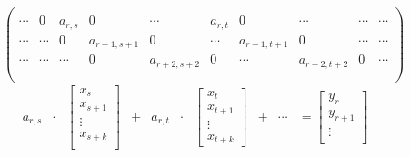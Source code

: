 \documentclass{article}
\begin{document}
      \begin{figure}[ht]
        \centering
        $$
        \begin{pmatrix}
          \\
          \cdots & 0 & a_{r,s} &  0 & \cdots & a_{r,t} & 0 & \cdots & \cdots & \cdots \\
          \cdots & \cdots & 0 & a_{r+1,s+1} & 0 & \cdots & a_{r+1,t+1} & 0 & \cdots & \cdots \\
          \cdots & \cdots & \cdots & 0 & a_{r+2,s+2} & 0 & \cdots & a_{r+2,t+2} & 0 & \cdots \\
          \\
        \end{pmatrix}
        $$
        $$
        \begin{matrix}
          a_{r,s} & \cdot & \begin{bmatrix}
                                    x_s      \\
                                    x_{s+1}  \\
                                      \vdots \\
                                    x_{s+k}  \\
          \end{bmatrix} & + & a_{r,t} & \cdot & \begin{bmatrix}
                                                x_t \\
                                                x_{t+1} \\
                                                \vdots \\
                                                x_{t+k}
                                                                              \end{bmatrix} & + & \cdots & =  \begin{bmatrix}
                                                                                                                 y_{r} \\
                                                                                                                 y_{r+1} \\
                                                                                                                 \vdots \\

\end{bmatrix}
\end{matrix}$$
\end{figure}
\end{document}
